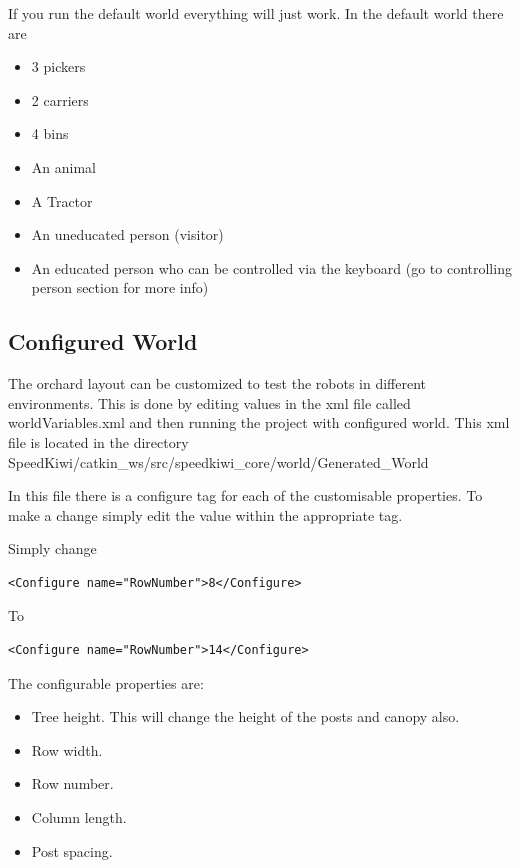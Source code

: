 \documentclass{article}
\begin{document}
If you run the default world everything will just work.
In the default world there are

\begin{itemize}
\item 3 pickers
\item 2 carriers
\item 4 bins
\item An animal
\item A Tractor
\item An uneducated person (visitor)
\item An educated person who can be controlled via the keyboard (go to controlling person section for more info)
\end{itemize}

\subsection{Configured World}

The orchard layout can be customized to test the robots in different environments.
This is done by editing values in the xml file called worldVariables.xml and then running the project with configured world.
This xml file is located in the directory SpeedKiwi/catkin\_ws/src/speedkiwi\_core/world/Generated\_World

In this file there is a configure tag for each of the customisable properties. To make a change simply edit the value within the appropriate tag.

Simply change
\begin{verbatim}
<Configure name="RowNumber">8</Configure>
\end{verbatim}
To
\begin{verbatim}
<Configure name="RowNumber">14</Configure>
\end{verbatim}

The configurable properties are:
\begin{itemize}
\item Tree height. This will change the height of the posts and canopy also.
\item Row width.
\item Row number.
\item Column length.
\item Post spacing.
\end{itemize}
\end{document}
